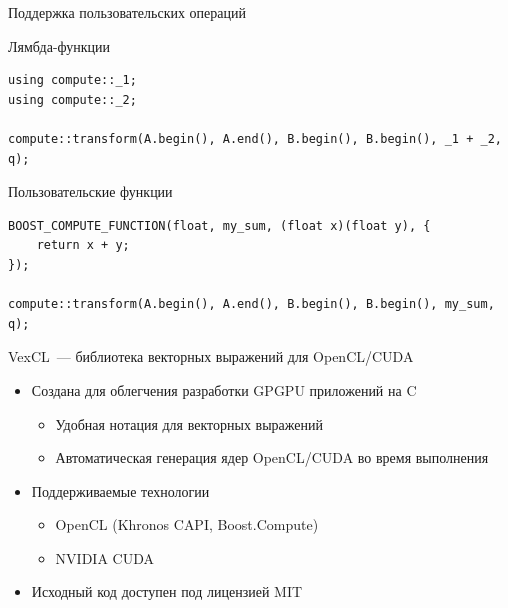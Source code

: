 \documentclass[@BEAMER_OPTIONS@]{beamer}
\newcommand{\CXX}{{\rm C}\plusplus}
\begin{document}
\begin{frame}[fragile]{Поддержка пользовательских операций}
    \begin{exampleblock}{Лямбда-функции}
        \begin{lstlisting}
using compute::_1;
using compute::_2;

compute::transform(A.begin(), A.end(), B.begin(), B.begin(), _1 + _2, q);
        \end{lstlisting}
    \end{exampleblock}
    \begin{exampleblock}{Пользовательские функции}
        \begin{lstlisting}
BOOST_COMPUTE_FUNCTION(float, my_sum, (float x)(float y), {
    return x + y;
});

compute::transform(A.begin(), A.end(), B.begin(), B.begin(), my_sum, q);
        \end{lstlisting}
    \end{exampleblock}
\end{frame}

\begin{frame}{VexCL~--- библиотека векторных выражений для OpenCL/CUDA}
    \begin{itemize}
        \item Создана для облегчения разработки GPGPU приложений на \CXX
            \begin{itemize}
                \item Удобная нотация для векторных выражений
                \item Автоматическая генерация ядер OpenCL/CUDA во время
                    выполнения
            \end{itemize}
            \vspace{\baselineskip}
        \item Поддерживаемые технологии
            \begin{itemize}
                \item OpenCL (Khronos \CXX API, Boost.Compute)
                \item NVIDIA CUDA
            \end{itemize}
            \vspace{\baselineskip}
        \item Исходный код доступен под лицензией MIT
    \end{itemize}
\end{frame}
\end{document}
